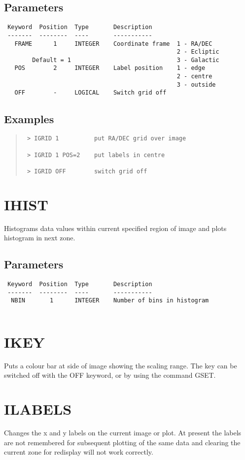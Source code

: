 \documentclass{book}
\renewcommand{\_}{{\tt\char'137}}     %
\begin{document}
\subsection{Parameters}
\begin{verbatim}
 Keyword  Position  Type       Description
 -------  --------  ----       -----------
   FRAME      1     INTEGER    Coordinate frame  1 - RA/DEC
                                                 2 - Ecliptic
        Default = 1                              3 - Galactic
   POS        2     INTEGER    Label position    1 - edge
                                                 2 - centre
                                                 3 - outside
   OFF        -     LOGICAL    Switch grid off
\end{verbatim}\subsection{Examples}
\begin{quote}\begin{verbatim}
 > IGRID 1          put RA/DEC grid over image
 
 > IGRID 1 POS=2    put labels in centre
 
 > IGRID OFF        switch grid off
 \end{verbatim}\end{quote}
\section{IHIST}
Histograms data values within current specified region of image
and plots histogram in next zone.
 
\subsection{Parameters}
\begin{verbatim}
 Keyword  Position  Type       Description
 -------  --------  ----       -----------
  NBIN       1      INTEGER    Number of bins in histogram
 
\end{verbatim}\section{IKEY}
Puts a colour bar at side of image showing the scaling range.
The key can be switched off with the OFF keyword, or by using
the command GSET.
 
\section{ILABELS}
Changes the x and y labels on the current image or plot. At
present the labels are not remembered for subsequent plotting
of the same data and clearing the current zone for redisplay
will not work correctly.
 
\end{document}
